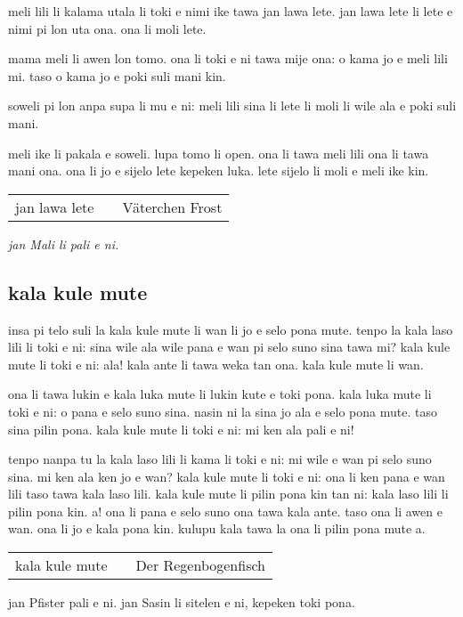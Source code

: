 meli lili li kalama utala li toki e nimi ike tawa jan lawa lete. 
jan lawa lete li lete e nimi pi lon uta ona. 
ona li moli lete.

mama meli li awen lon tomo. 
ona li toki e ni tawa mije ona: 
\glqq o kama jo e meli lili mi. 
taso o kama jo e poki suli mani kin.\grqq

soweli pi lon anpa supa li mu e ni: 
\glqq meli lili sina li lete li moli li wile ala e poki suli mani.\grqq

meli ike li pakala e soweli. 
lupa tomo li open. 
ona li tawa meli lili ona li tawa mani ona. 
ona li jo e sijelo lete kepeken luka. 
lete sijelo li moli e meli ike kin.

\begin{supertabular}{p{5,5cm}|ll}
jan lawa lete  && Väterchen Frost  \\
\end{supertabular}

\textit{jan Mali li pali e ni. \cite{www:astrodonunt:01}}
%
\subsection{kala kule mute}

insa pi telo suli la kala kule mute li wan li jo e selo pona mute.
tenpo la kala laso lili li toki e ni:  \glqq sina wile ala wile pana e wan pi selo suno sina tawa mi?\grqq      
kala kule mute li toki e ni:  \glqq ala!\grqq     
kala ante li tawa weka tan ona. kala kule mute li wan.

ona li tawa lukin e kala luka mute li lukin kute e toki pona.
kala luka mute li toki e ni:  \glqq o pana e selo suno sina. nasin ni la sina jo ala e selo pona mute. taso sina pilin pona.\grqq   
kala kule mute li toki e ni:  \glqq mi ken ala pali e ni!\grqq     

tenpo nanpa tu la kala laso lili li kama li toki e ni:  \glqq mi wile e wan pi selo suno sina. mi ken ala ken jo e wan?\grqq  
kala kule mute li toki e ni: ona li ken pana e wan lili taso tawa kala laso lili.
kala kule mute li pilin pona kin tan ni: kala laso lili li pilin pona kin. a!
ona li pana e selo suno ona tawa kala ante. taso ona li awen e wan.
ona li jo e kala pona kin.
kulupu kala tawa la ona li pilin pona mute a.

\begin{supertabular}{p{5,5cm}|ll}
kala kule mute && Der Regenbogenfisch \\
\end{supertabular}

jan  \glqqMarcus Pfister \grqq   pali e ni. jan Sasin li sitelen e ni, kepeken toki pona.
%

%
